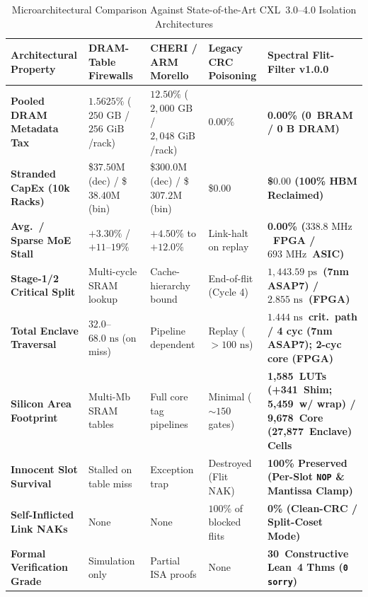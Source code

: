 \documentclass[10pt,twocolumn]{article}
\providecommand{\ReleaseVersion}{v1.0.0}
\providecommand{\LeanTheoremTotal}{30}
\providecommand{\CoreClbLuts}{1,585}
\providecommand{\ScrubShimLuts}{341}
\providecommand{\WrapperLuts}{5,459}
\providecommand{\StageTwoNs}{\ensuremath{2.855\text{~ns}}}
\providecommand{\CoreFmax}{\ensuremath{338.8\text{~MHz}}}
\providecommand{\AsicCoreCells}{9,678}
\providecommand{\AsicStandardCells}{27,877}
\providecommand{\AsicStageOneTwoDelayPs}{\ensuremath{1,443.59\text{~ps}}}
\providecommand{\AsicFourStageDelayNs}{\ensuremath{1.444\text{~ns}}}
\providecommand{\AsicFmaxMhz}{\ensuremath{693\text{~MHz}}}
\providecommand{\CorePhysicalLUTs}{\CoreClbLuts}
\providecommand{\ScrubShimPhysicalLUTs}{\ScrubShimLuts}
\providecommand{\WrapperEnclaveLUTs}{\WrapperLuts}
\providecommand{\CoreBRAM}{0}
\providecommand{\StageTwoCriticalPathNs}{\StageTwoNs}
\providecommand{\PostRouteFmaxMHz}{\CoreFmax}
\theoremstyle{spectralthm}
\begin{document}
\begin{table}[!tp]
\centering
\footnotesize
\setlength{\tabcolsep}{5.6pt}
\renewcommand{\arraystretch}{1.22}
\caption{Microarchitectural Comparison Against State-of-the-Art CXL~3.0--4.0 Isolation Architectures}
\label{tab:comparison}
\begin{tabularx}{\textwidth}{@{}>{\raggedright\hyphenpenalty=10000\arraybackslash}p{1.38in} >{\raggedright\arraybackslash}X >{\raggedright\arraybackslash}X >{\raggedright\arraybackslash}X >{\raggedright\arraybackslash}X@{}}
\toprule
\textbf{Architectural Property} & \textbf{DRAM-Table Firewalls~\cite{goswami2026spacecontrol}} & \textbf{CHERI / ARM Morello~\cite{watson2015cheri}} & \textbf{Legacy CRC Poisoning} & \textbf{Spectral Flit-Filter \ReleaseVersion} \\
\midrule
\textbf{Pooled DRAM Metadata Tax} & $1.5625\%$ ($250\text{~GB}$ / $256\text{~GiB}$/rack) & $12.50\%$ ($2,000\text{~GB}$ / $2,048\text{~GiB}$/rack) & $0.00\%$ & \textbf{0.00\% (\CoreBRAM\ BRAM / 0 B DRAM)} \\
\textbf{Stranded CapEx (10k Racks)} & \$$37.50\text{M}$ (dec) / \$$38.40\text{M}$ (bin) & \$$300.0\text{M}$ (dec) / \$$307.2\text{M}$ (bin) & \$$0.00$ & \textbf{\$$0.00$ (100\% HBM Reclaimed)} \\
\textbf{Avg.\ / Sparse MoE Stall} & $+3.30\%$ / $+11$--$19\%$ & $+4.50\%$ to $+12.0\%$ & Link-halt on replay & \textbf{0.00\% (\PostRouteFmaxMHz\ FPGA / \AsicFmaxMhz\ ASIC)} \\
\textbf{Stage-1/2 Critical Split} & Multi-cycle SRAM lookup & Cache-hierarchy bound & End-of-flit (Cycle 4) & \textbf{\AsicStageOneTwoDelayPs\ (7nm ASAP7) / \StageTwoCriticalPathNs\ (FPGA)} \\
\textbf{Total Enclave Traversal} & $32.0$--$68.0\text{~ns}$ (on miss) & Pipeline dependent & Replay ($>100\text{~ns}$) & \textbf{\AsicFourStageDelayNs\ crit.\ path / 4 cyc (7nm ASAP7); 2-cyc core (FPGA)} \\
\textbf{Silicon Area Footprint} & Multi-Mb SRAM tables & Full core tag pipelines & Minimal ($\sim 150$ gates) & \textbf{\CorePhysicalLUTs\ LUTs (+\ScrubShimPhysicalLUTs\ Shim; \WrapperEnclaveLUTs\ w/ wrap) / \AsicCoreCells\ Core (\AsicStandardCells\ Enclave) Cells} \\
\textbf{Innocent Slot Survival} & Stalled on table miss & Exception trap & Destroyed (Flit NAK) & \textbf{100\% Preserved (Per-Slot \texttt{NOP} \& Mantissa Clamp)} \\
\textbf{Self-Inflicted Link NAKs} & None & None & $100\%$ of blocked flits & \textbf{0\% (Clean-CRC / Split-Coset Mode)} \\
\textbf{Formal Verification Grade} & Simulation only & Partial ISA proofs & None & \textbf{\LeanTheoremTotal\ Constructive Lean~4 Thms (\texttt{0 sorry})} \\
\bottomrule
\end{tabularx}
\end{table}
\end{document}

